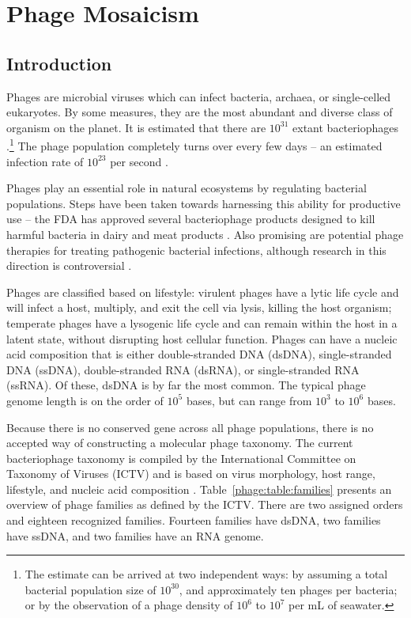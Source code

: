 \chapter{Phage Mosaicism}
\label{ch:phage}

\section{Introduction}
\label{phage:introduction}

Phages are microbial viruses which can infect bacteria, archaea, or single-celled eukaryotes.
By some measures, they are the most abundant and diverse class of organism on the planet.
It is estimated that there are $10^{31}$ extant bacteriophages \cite{Rohwer:2014vz}.\footnote{The estimate can be arrived at two independent ways: by assuming a total bacterial population size of $10^{30}$, and approximately ten phages per bacteria; or by the observation of a phage density of $10^{6}$ to $10^{7}$ per mL of seawater.}
The phage population completely turns over every few days -- an estimated infection rate of $10^{23}$ per second \cite{Suttle:2007cj}.

Phages play an essential role in natural ecosystems by regulating bacterial populations.
Steps have been taken towards harnessing this ability for productive use -- the FDA has approved several bacteriophage products designed to kill harmful bacteria in dairy and meat products \cite{Bren:2007wn}.
Also promising are potential phage therapies for treating pathogenic bacterial infections, although research in this direction is controversial \cite{Keen:2012du}.

Phages are classified based on lifestyle: virulent phages have a lytic life cycle and will infect a host, multiply, and exit the cell via lysis, killing the host organism; temperate phages have a lysogenic life cycle and can remain within the host in a latent state, without disrupting host cellular function.
Phages can have a nucleic acid composition that is either double-stranded DNA (dsDNA), single-stranded DNA (ssDNA), double-stranded RNA (dsRNA), or single-stranded RNA (ssRNA).
Of these, dsDNA is by far the most common.
The typical phage genome length is on the order of $10^{5}$ bases, but can range from $10^{3}$ to $10^{6}$ bases.

Because there is no conserved gene across all phage populations, there is no accepted way of constructing a molecular phage taxonomy.
The current bacteriophage taxonomy is compiled by the International Committee on Taxonomy of Viruses (ICTV) and is based on virus morphology, host range, lifestyle, and nucleic acid composition \cite{ICTV:2012}.
Table~\ref{phage:table:families} presents an overview of phage families as defined by the ICTV.
There are two assigned orders and eighteen recognized families.
Fourteen families have dsDNA, two families have ssDNA, and two families have an RNA genome.

